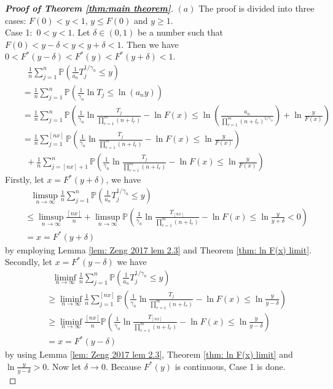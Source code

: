 \documentclass[12pt]{article}
\theoremstyle{plain}
\theoremstyle{definition}
\theoremstyle{remark}
\begin{document}
\begin{proof}[\textit{\textbf{Proof of Theorem \ref{thm:main theorem}}}]


$(a)$ The proof is divided into three cases: $F(0)<y<1$, $y\leq F(0)$ and $y\geq 1$.\\
Case 1:\ $0<y<1$. Let $\delta \in(0,1)$ be a number such that $F(0)<y-\delta<y<y+\delta<1$. Then we have $0<F^{*}(y-\delta)<F^{*}(y)<F^{*}(y+\delta)<1$.
\begin{eqnarray*}
&&\ \ \     \frac{1}{n} \sum_{j=1}^{n} \mathbb{P}\left(\frac{1}{a_n}T_j^{1 / \gamma_{n}} \leq y\right)\\
&&=\frac{1}{n} \sum_{j=1}^{n} \mathbb{P}\left(\frac{1}{\gamma_{n}}\ln T_{j} \leq  \ln (a_n y)\right)\\
&&=\frac{1}{n} \sum_{j=1}^{n} \mathbb{P}\left(\frac{1}{\gamma_{n}}
\ln \frac{T_{j}}{\prod_{r=1}^{m}\left(n+l_{r}\right)}-\ln F(x)
\leq  \ln ( \frac{a_n}{\prod_{r=1}^{m}(n+l_r)^{1/\gamma_{n}}})+\ln \frac{y}{F(x)}   \right)\\
&&=\frac{1}{n} \sum_{j=1}^{[nx]} \mathbb{P}\left(\frac{1}{\gamma_{n}}
\ln \frac{T_{j}}{\prod_{r=1}^{m}\left(n+l_{r}\right)}-\ln F(x)
\leq  \ln \frac{y}{F(x)}   \right)\\
&&\ \ +\frac{1}{n} \sum_{j=[nx]+1}^{n} \mathbb{P}\left(\frac{1}{\gamma_{n}}
\ln \frac{T_{j}}{\prod_{r=1}^{m}\left(n+l_{r}\right)}-\ln F(x)
\leq  \ln \frac{y}{F(x)}   \right)
\end{eqnarray*}
Firstly, let $x=F^{*}(y+\delta)$, we have
\begin{eqnarray*}
&&\ \ \  \limsup _{n \rightarrow \infty}   \frac{1}{n} \sum_{j=1}^{n} \mathbb{P}\left(\frac{1}{a_n}T_j^{1 / \gamma_{n}} \leq y\right)\\
&&\leq \limsup _{n \rightarrow \infty}  \frac{[nx]}{n}+ \limsup _{n \rightarrow \infty}  \mathbb{P}\left(\frac{1}{\gamma_{n}}
\ln \frac{T_{[nx]}}{\prod_{r=1}^{m}\left(n+l_{r}\right)}-\ln F(x)
\leq  \ln \frac{y}{y+\delta}<0   \right)\\
&&=x=F^{*}(y+\delta)
\end{eqnarray*}
by employing Lemma \ref{lem: Zeng 2017   lem 2.3} and Theorem \ref{thm: ln F(x) limit}.\\
Secondly, let $x=F^{*}(y-\delta)$  we have
\begin{eqnarray*}
    &&\ \ \  \liminf _{n \rightarrow \infty}   \frac{1}{n} \sum_{j=1}^{n} \mathbb{P}\left(\frac{1}{a_n}T_j^{1 / \gamma_{n}} \leq y\right)\\
    &&\geq \liminf _{n \rightarrow \infty}  \frac{1}{n} \sum_{j=1}^{[nx]} \mathbb{P}\left(\frac{1}{\gamma_{n}}
    \ln \frac{T_{j}}{\prod_{r=1}^{m}\left(n+l_{r}\right)}-\ln F(x)
    \leq  \ln \frac{y}{y-\delta}   \right)\\
    &&\geq \liminf _{n \rightarrow \infty}  \frac{[nx]}{n} \mathbb{P}\left(\frac{1}{\gamma_{n}}
    \ln \frac{T_{[nx]}}{\prod_{r=1}^{m}\left(n+l_{r}\right)}-\ln F(x)
    \leq  \ln \frac{y}{y-\delta}   \right)\\
    &&=x=F^{*}(y-\delta)
\end{eqnarray*}
by using Lemma \ref{lem: Zeng 2017   lem 2.3}, Theorem \ref{thm: ln F(x) limit} and $\ln \frac{y}{y-\delta}>0$.
Now let $\delta\to 0$. Because $F^*(y)$ is continuous, Case 1 is done.\\


\end{proof}
\end{document}
